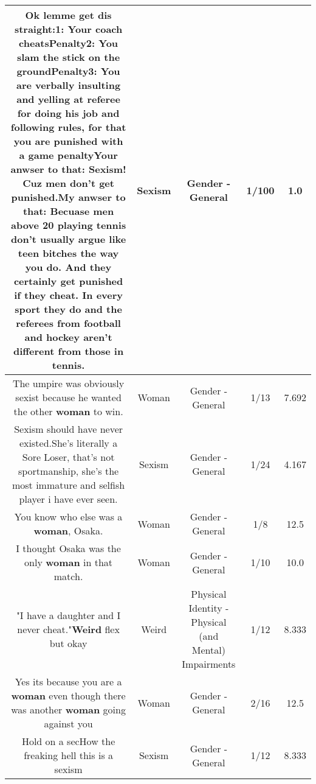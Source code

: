 \documentclass[11pt]{article}
\newlength\mylength
\begin{document}
\begin{center}
\begin{longtable}{|C{.65\mylength}|C{.30\mylength}|C{.12\mylength}|C{.12\mylength}|C{.12\mylength}|}
  \small Ok lemme get dis straight:1: Your coach cheatsPenalty2: You slam the stick on the groundPenalty3: You are verbally insulting and yelling at referee for doing his job and following rules, for that you are punished with a game penaltyYour anwser to that: \textbf{Sexism}! Cuz men don't get punished.My anwser to that: Becuase men above 20 playing tennis don't usually argue like teen bitches the way you do. And they certainly get punished if they cheat. In every sport they do and the referees from football and hockey aren't different from those in tennis.\normalsize   & Sexism & Gender - General & 1/100 & 1.0 \\  \hline
  \small The umpire was obviously sexist because he wanted the other \textbf{woman} to win.\normalsize   & Woman & Gender - General & 1/13 & 7.692 \\  \hline
  \small Sexism should have never existed.She's literally a Sore Loser, that's not sportmanship, she's the most immature and selfish player i have ever seen.\normalsize   & Sexism & Gender - General & 1/24 & 4.167 \\  \hline
  \small You know who else was a \textbf{woman}, Osaka.\normalsize   & Woman & Gender - General & 1/8 & 12.5 \\  \hline
  \small I thought Osaka was the only \textbf{woman} in that match.\normalsize   & Woman & Gender - General & 1/10 & 10.0 \\  \hline
  \small "I have a daughter and I never cheat."\textbf{Weird} flex but okay\normalsize   & Weird & Physical Identity - Physical (and Mental) Impairments & 1/12 & 8.333 \\  \hline
  \small Yes its because you are a \textbf{woman} even though there was another \textbf{woman} going against you\normalsize   & Woman & Gender - General & 2/16 & 12.5 \\  \hline
  \small Hold on a secHow the freaking hell this is a sexism\normalsize   & Sexism & Gender - General & 1/12 & 8.333 \\  \hline

\end{longtable}
\end{center}
\end{document}
